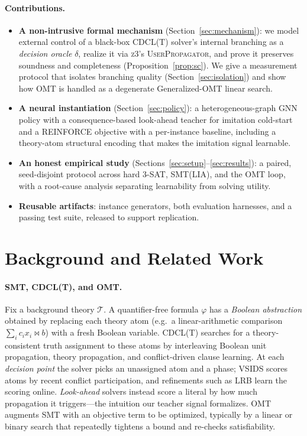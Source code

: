 \documentclass[letterpaper]{article} %
\theoremstyle{definition}
\theoremstyle{plain}
\theoremstyle{remark}
\newcommand{\solver}{\textsc{z3}}
\begin{document}
\paragraph{Contributions.}
\begin{itemize}
\item \textbf{A non-intrusive formal mechanism} (Section~\ref{sec:mechanism}):
we model external control of a black-box \textsc{CDCL(T)} solver's internal
branching as a \emph{decision oracle} $\delta$, realize it via
\solver{}'s \textsc{UserPropagator}, and prove it preserves soundness and
completeness (Proposition~\ref{prop:sc}). We give a measurement protocol
that isolates branching quality (Section~\ref{sec:isolation}) and show how
OMT is handled as a degenerate Generalized-OMT linear search.
\item \textbf{A neural instantiation} (Section~\ref{sec:policy}): a
heterogeneous-graph GNN policy with a consequence-based look-ahead teacher
for imitation cold-start and a REINFORCE objective with a per-instance
baseline, including a theory-atom structural encoding that makes the
imitation signal learnable.
\item \textbf{An honest empirical study} (Sections~\ref{sec:setup}--\ref{sec:results}):
a paired, seed-disjoint protocol across hard 3-SAT, SMT(LIA), and the OMT
loop, with a root-cause analysis separating learnability from solving
utility.
\item \textbf{Reusable artifacts}: instance generators, both evaluation
harnesses, and a passing test suite, released to support replication.
\end{itemize}

\section{Background and Related Work}

\paragraph{SMT, CDCL(T), and OMT.}
Fix a background theory $\mathcal{T}$. A quantifier-free formula $\varphi$
has a \emph{Boolean abstraction} obtained by replacing each theory atom
(e.g.\ a linear-arithmetic comparison $\sum_i c_i x_i \bowtie b$) with a
fresh Boolean variable. \textsc{CDCL(T)} \citep{nieuwenhuis2006dpllt}
searches for a theory-consistent truth assignment to these atoms by
interleaving Boolean unit propagation, theory propagation, and
conflict-driven clause learning. At each \emph{decision point} the solver
picks an unassigned atom and a phase; VSIDS \citep{moskewicz2001chaff}
scores atoms by recent conflict participation, and refinements such as LRB
\citep{liang2016lrb} learn the scoring online. \emph{Look-ahead} solvers
\citep{heule2021lookahead} instead score a literal by how much propagation
it triggers---the intuition our teacher signal formalizes. OMT
\citep{sebastiani2015pushing,bjorner2015nz,trentin2019omt} augments SMT with
an objective term to be optimized, typically by a linear or binary search
that repeatedly tightens a bound and re-checks satisfiability.
\end{document}
